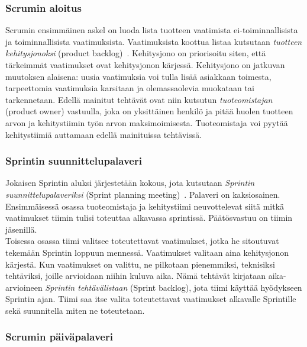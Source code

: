 \documentclass[finnish]{../tktltiki2}
\theoremstyle{definition}
\theoremstyle{remark}
\begin{document}
\subsubsection{Scrumin aloitus}

Scrumin ensimmäinen askel on luoda lista tuotteen vaatimista
ei-toiminnalli\-sista ja toiminnallisista vaatimuksista. Vaatimuksista
koottua listaa kutsutaan \emph{tuotteen kehitysjonoksi} (product backlog)~\cite{ScrumFinnishGuide}. Kehitysjono on priorisoitu siten, että tärkeimmät vaatimukset ovat kehitysjonon kärjessä. Kehitysjono on jatkuvan muutoksen alaisena: uusia vaatimuksia
voi tulla lisää asiakkaan toimesta, tarpeettomia vaatimuksia karsitaan ja olemassaolevia muokataan tai tarkennetaan. Edellä mainitut tehtävät
ovat niin kutsutun \emph{tuoteomistajan} (product owner) vastuulla,
joka on yksittäinen henkilö ja pitää huolen tuotteen arvon ja kehitystiimin työn arvon maksimoimisesta. Tuoteomistaja voi pyytää kehitystiimiä auttamaan edellä mainituissa tehtävissä.

\subsubsection{Sprintin suunnittelupalaveri}

Jokaisen Sprintin aluksi järjestetään kokous, jota kutsutaan \emph{Sprintin suunnittelupalaveriksi} (Sprint planning meeting)~\cite{ScrumHandBook}. Palaveri on kaksiosainen.
Ensimmäisessä osassa tuoteomistaja ja kehitystiimi neuvottelevat
siitä mitkä vaatimukset tiimin tulisi toteuttaa alkavassa
sprintissä. Päätösvastuu on tiimin jäsenillä.\\

Toisessa osassa tiimi valitsee toteutettavat vaatimukset, jotka
he sitoutuvat tekemään Sprintin loppuun mennessä. Vaatimukset
valitaan aina kehitysjonon kärjestä.
Kun vaatimukset on valittu, ne pilkotaan pienemmiksi, teknisiksi
tehtäviksi, joille arvioidaan niihin kuluva aika. Nämä tehtävät kirjataan aika-arvioineen \emph{Sprintin tehtävälistaan} (Sprint backlog), jota tiimi käyttää hyödykseen Sprintin ajan. Tiimi saa itse valita toteutettavat vaatimukset alkavalle Sprintille sekä suunnitella miten ne toteutetaan.

\subsubsection{Scrumin päiväpalaveri}
\end{document}
